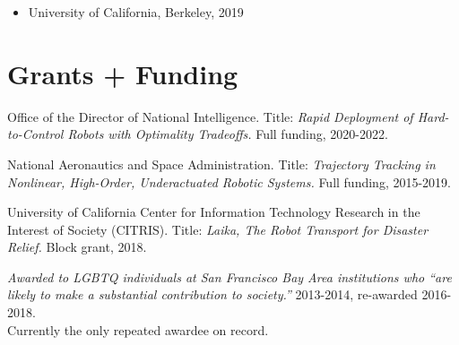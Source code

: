 \documentclass[letterpaper]{deedy-resume} %
\begin{document}
{\begin{itemize}
\item {{} University of California, Berkeley, 2019}


\end{itemize}




\section{Grants + Funding}

\vspace{0.2cm}


\begin{etaremune}[itemsep=0.1cm]

\item {{} Office of the Director of National Intelligence. Title: {\it Rapid Deployment of Hard-to-Control Robots with Optimality Tradeoffs.} Full funding, 2020-2022.}

\item {{} National Aeronautics and Space Administration. Title: {\it Trajectory Tracking in Nonlinear, High-Order, Underactuated Robotic Systems.} Full funding, 2015-2019.}
  
\item {{} University of California Center for Information Technology Research in the Interest of Society (CITRIS). Title: {\it Laika, The Robot Transport for Disaster Relief.}  Block grant, 2018.}

\item {{} {\it Awarded to LGBTQ individuals at San Francisco Bay Area institutions who ``are likely to make a substantial contribution to society.''} 2013-2014, re-awarded 2016-2018.\\ Currently the only repeated awardee on record.}


\end{etaremune}}
\end{document}
